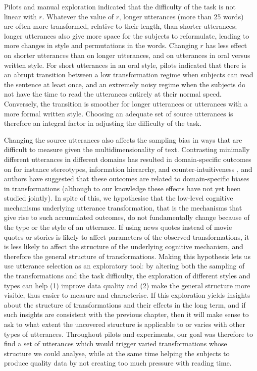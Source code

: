 Pilots and manual exploration indicated that the difficulty of the task
is not linear with \(r\). Whatever the value of \(r\), longer utterances
(more than 25 words) are often more transformed, relative to their
length, than shorter utterances; longer utterances also give more space
for the subjects to reformulate, leading to more changes in style and
permutations in the words. Changing \(r\) has less effect on shorter
utterances than on longer utterances, and on utterances in oral versus
written style. For short utterances in an oral style, pilots indicated
that there is an abrupt transition between a low transformation regime
when subjects can read the sentence at least once, and an extremely
noisy regime when the subjects do not have the time to read the
utterances entirely at their normal speed. Conversely, the transition is
smoother for longer utterances or utterances with a more formal written
style. Choosing an adequate set of source utterances is therefore an
integral factor in adjusting the difficulty of the task.

Changing the source utterances also affects the sampling bias in ways
that are difficult to measure given the multidimensionality of text.
Contrasting minimally different utterances in different domains has
resulted in domain-specific outcomes on for instance stereotypes,
information hierarchy, and counter-intuitiveness
\autocites{kashima_maintaining_2000}{mesoudi_bias_2006}{barrett_spreading_2001}{mesoudi_multiple_2008},
and authors have suggested that these outcomes are related to
domain-specific biases in transformations (although to our knowledge
these effects have not yet been studied jointly). In spite of this, we
hypothesise that the low-level cognitive mechanisms underlying utterance
transformation, that is the mechanisms that give rise to such
accumulated outcomes, do not fundamentally change because of the type or
the style of an utterance. If using news quotes instead of movie quotes
or stories is likely to affect parameters of the observed
transformations, it is less likely to affect the structure of the
underlying cognitive mechanism, and therefore the general structure of
transformations. Making this hypothesis lets us use utterance selection
as an exploratory tool: by altering both the sampling of the
transformations and the task difficulty, the exploration of different
styles and types can help (1) improve data quality and (2) make the
general structure more visible, thus easier to measure and characterise.
If this exploration yields insights about the structure of
transformations and their effects in the long term, and if such insights
are consistent with the previous chapter, then it will make sense to ask
to what extent the uncovered structure is applicable to or varies with
other types of utterances. Throughout pilots and experiments, our goal
was therefore to find a set of utterances which would trigger varied
transformations whose structure we could analyse, while at the same time
helping the subjects to produce quality data by not creating too much
pressure with reading time.

